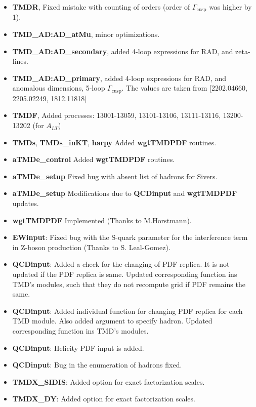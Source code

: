 \documentclass[prd,nofootinbib,eqsecnum,final]{revtex4}
\renewcommand{\(}{\left(}
\renewcommand{\)}{\right)}
\renewcommand{\[}{\left[}
\renewcommand{\]}{\right]}
\begin{document}
\begin{itemize}
\begin{itemize}
	\item \textbf{TMDR}, Fixed mistake with counting of orders (order of $\Gamma_{\text{cusp}}$ was higher by 1).
	\item \textbf{TMD\_AD:AD\_atMu}, minor optimizations.
	\item \textbf{TMD\_AD:AD\_secondary}, added 4-loop expressions for RAD, and zeta-lines.
	\item \textbf{TMD\_AD:AD\_primary}, added 4-loop expressions for RAD, and anomalous dimensions, 5-loop $\Gamma_{\text{cusp}}$. The values are taken from [2202.04660, 2205.02249, 1812.11818]
	\item \textbf{TMDF}, Added processes: 13001-13059, 13101-13106, 13111-13116, 13200-13202 (for $A_{LT}$)
	\item \textbf{TMDs}, \textbf{TMDs\_inKT}, \textbf{harpy} Added \textbf{wgtTMDPDF} routines.
	\item \textbf{aTMDe\_control} Added \textbf{wgtTMDPDF} routines.
	\item \textbf{aTMDe\_setup} Fixed bug with absent list of hadrons for Sivers.
	\item \textbf{aTMDe\_setup} Modifications due to \textbf{QCDinput} and \textbf{wgtTMDPDF} updates.
	\item \textbf{wgtTMDPDF} Implemented (Thanks to M.Horstmann).
	\item \textbf{EWinput}: Fixed bug with the S-quark parameter for the interference term in Z-boson production (Thanks to S. Leal-Gomez).
	\item \textbf{QCDinput}: Added a check for the changing of PDF replica. It is not updated if the PDF replica is same. Updated corresponding function ins TMD's modules, such that they do not recompute grid if PDF remains the same.
	\item \textbf{QCDinput}: Added individual function for changing PDF replica for each TMD module. Also added argument to specify hadron. Updated corresponding function ins TMD's modules.
	\item \textbf{QCDinput}: Helicity PDF input is added.
	\item \textbf{QCDinput}: Bug in the enumeration of hadrons fixed.
	\item \textbf{TMDX\_SIDIS}: Added option for exact factorization scales.
	\item \textbf{TMDX\_DY}: Added option for exact factorization scales.
\end{itemize}


\end{itemize}
\end{document}
